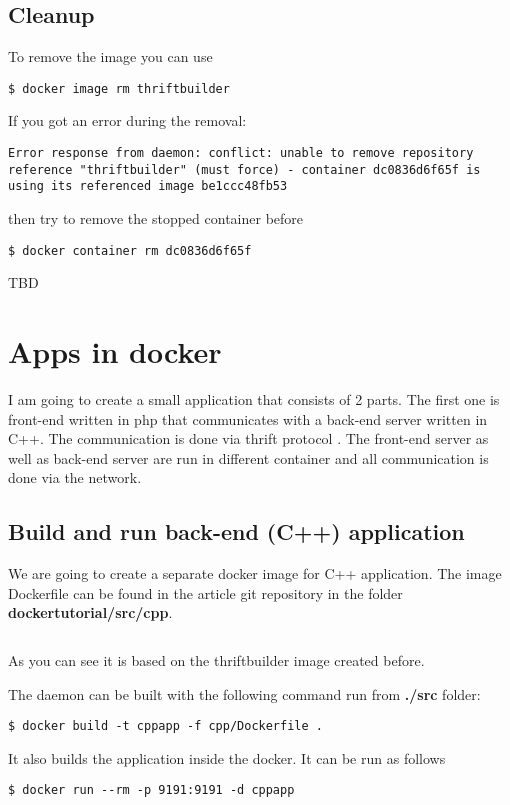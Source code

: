 \documentclass[14pt,a4paper]{article}
\begin{document}
\subsection{Cleanup}
To remove the image you can use
\begin{verbatim}
$ docker image rm thriftbuilder
\end{verbatim}
If you got an error during the removal:
\begin{verbatim}
Error response from daemon: conflict: unable to remove repository
reference "thriftbuilder" (must force) - container dc0836d6f65f is
using its referenced image be1ccc48fb53
\end{verbatim}
then try to remove the stopped container before
\begin{verbatim}
$ docker container rm dc0836d6f65f
\end{verbatim}
TBD

\section{Apps in docker}
I am going to create a small application that consists of 2 parts. The
first one is front-end written in php that communicates with a back-end server
written in C++. The communication is done via thrift protocol
\cite{apache:thrift}. The front-end server as well as back-end server
are run in different container and all communication is done via the
network. 

\subsection{Build and run back-end (C++) application}
We are going to create a separate docker image for C++ application.
The image Dockerfile can be found in the article git
repository \cite{github:articles_ivanmurashko} in the folder 
\textbf{dockertutorial/src/cpp}.
\inputminted{shell}{./src/cpp/Dockerfile}
As you can see it is based on the thriftbuilder image created before. 

The daemon can be built with the following command run from
\textbf{./src} folder:
\begin{verbatim}
$ docker build -t cppapp -f cpp/Dockerfile .
\end{verbatim}
It also builds the application inside the docker. It can be run as
follows
\begin{verbatim}
$ docker run --rm -p 9191:9191 -d cppapp
\end{verbatim}
\end{document}
